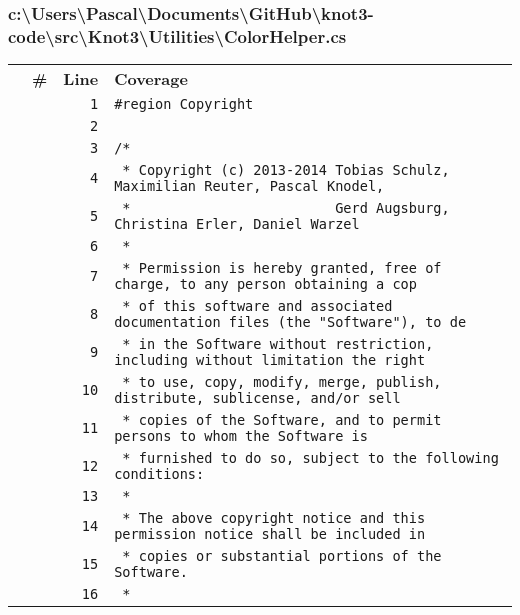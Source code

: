 \documentclass[a4paper,10pt]{article}
\begin{document}
\subsubsection{c:\textbackslash Users\textbackslash Pascal\textbackslash Documents\textbackslash GitHub\textbackslash knot3-code\textbackslash src\textbackslash Knot3\textbackslash Utilities\textbackslash ColorHelper.cs}
\begin{longtable}[l]{lrrl}
\textbf{} & \textbf{\#} & \textbf{Line} & \textbf{Coverage}\\
\cellcolor{gray} &  & \verb~1~ & \verb~#region Copyright~\\
\cellcolor{gray} &  & \verb~2~ & \verb~~\\
\cellcolor{gray} &  & \verb~3~ & \verb~/*~\\
\cellcolor{gray} &  & \verb~4~ & \verb~ * Copyright (c) 2013-2014 Tobias Schulz, Maximilian Reuter, Pascal Knodel,~\\
\cellcolor{gray} &  & \verb~5~ & \verb~ *                         Gerd Augsburg, Christina Erler, Daniel Warzel~\\
\cellcolor{gray} &  & \verb~6~ & \verb~ *~\\
\cellcolor{gray} &  & \verb~7~ & \verb~ * Permission is hereby granted, free of charge, to any person obtaining a cop~\\
\cellcolor{gray} &  & \verb~8~ & \verb~ * of this software and associated documentation files (the "Software"), to de~\\
\cellcolor{gray} &  & \verb~9~ & \verb~ * in the Software without restriction, including without limitation the right~\\
\cellcolor{gray} &  & \verb~10~ & \verb~ * to use, copy, modify, merge, publish, distribute, sublicense, and/or sell~\\
\cellcolor{gray} &  & \verb~11~ & \verb~ * copies of the Software, and to permit persons to whom the Software is~\\
\cellcolor{gray} &  & \verb~12~ & \verb~ * furnished to do so, subject to the following conditions:~\\
\cellcolor{gray} &  & \verb~13~ & \verb~ *~\\
\cellcolor{gray} &  & \verb~14~ & \verb~ * The above copyright notice and this permission notice shall be included in ~\\
\cellcolor{gray} &  & \verb~15~ & \verb~ * copies or substantial portions of the Software.~\\
\cellcolor{gray} &  & \verb~16~ & \verb~ *~\\

\end{longtable}
\end{document}
